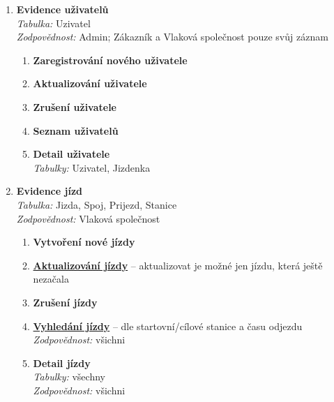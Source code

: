 \documentclass[11pt]{article}
\begin{document}
\begin{enumerate}
    \item \textbf{Evidence uživatelů}\\
        \textit{Tabulka:} Uzivatel\\
        \textit{Zodpovědnost:} Admin; Zákazník a Vlaková společnost pouze svůj záznam
        \begin{enumerate}
            \item \textbf{Zaregistrování nového uživatele}
            \item \textbf{Aktualizování uživatele}
            \item \textbf{Zrušení uživatele}
            \item \textbf{Seznam uživatelů}
            \item \textbf{Detail uživatele}\\
            \textit{Tabulky:} Uzivatel, Jizdenka
        \end{enumerate}

    \item \textbf{Evidence jízd}\\
        \textit{Tabulka:} Jizda, Spoj, Prijezd, Stanice\\
        \textit{Zodpovědnost:} Vlaková společnost
        \begin{enumerate}
            \item \textbf{Vytvoření nové jízdy}
            \item \underline{\textbf{Aktualizování jízdy}} – aktualizovat je možné jen jízdu, která ještě nezačala
            \item \textbf{Zrušení jízdy}
            \item \underline{\textbf{Vyhledání jízdy}} – dle startovní/cílové stanice a času odjezdu\\
            \textit{Zodpovědnost:} všichni
            \item \textbf{Detail jízdy}\\
            \textit{Tabulky:} všechny\\
            \textit{Zodpovědnost:} všichni
        \end{enumerate}


\end{enumerate}
\end{document}
